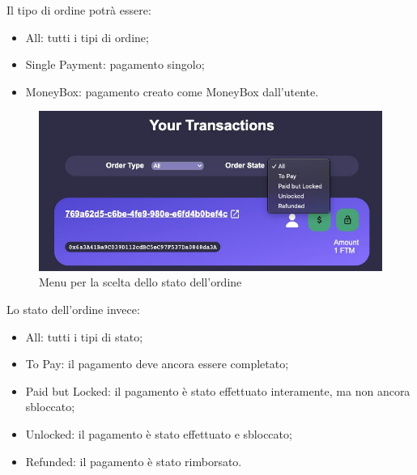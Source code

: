 Il tipo di ordine potrà essere:
\begin{itemize}
    \item All: tutti i tipi di ordine;
    \item Single Payment: pagamento singolo;
    \item MoneyBox: pagamento creato come MoneyBox dall'utente.
\end{itemize}

\begin{figure}[H]
    \centering
    \includegraphics[scale=0.4]{immagini/orderstate.jpg}
    \caption{Menu per la scelta dello stato dell'ordine}
\end{figure}

Lo stato dell'ordine invece:
\begin{itemize}
    \item All: tutti i tipi di stato;
    \item To Pay: il pagamento deve ancora essere completato;
    \item Paid but Locked: il pagamento è stato effettuato interamente, ma non ancora sbloccato;
    \item Unlocked: il pagamento è stato effettuato e sbloccato;
    \item Refunded: il pagamento è stato rimborsato.
\end{itemize}

